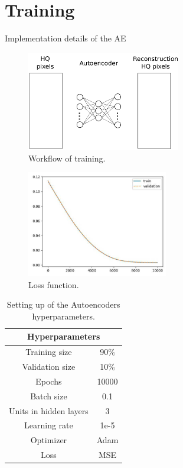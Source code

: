 \documentclass{beamer}
\begin{document}
\section{Training}
\begin{frame}{Implementation details of the AE}
    \begin{minipage}{0.6\textwidth}
        \begin{figure}
            \includegraphics[width=0.6\textwidth]{Figures/v3/main/training.pdf}
            \caption{Workflow of training.}  
        \end{figure}
        \begin{figure}
            \includegraphics[width=0.55\textwidth]{Figures/v3/main/loss.jpg}
            \caption{Loss function.}  
            \centering
        \end{figure}
    \end{minipage}
    \begin{minipage}{0.35\textwidth}
        \begin{table}
            \scriptsize
            \begin{tabular}{c|c}
            \hline
                \multicolumn{2}{c}{Hyperparameters} \\ \hline
                Training size & 90$\%$ \\ [1ex]
                Validation size & 10$\%$ \\ [1ex]
                Epochs & 10000 \\ 
                Batch size & 0.1 \\ 
                Units in hidden layers & 3 \\ 
                Learning rate & 1e-5 \\ 
                Optimizer & Adam \\ 
                Loss & MSE \\ \hline
            \end{tabular}
            \caption{Setting up of the Autoencoders hyperparameters.}
        \end{table}
    \end{minipage}
\end{frame}
\end{document}
